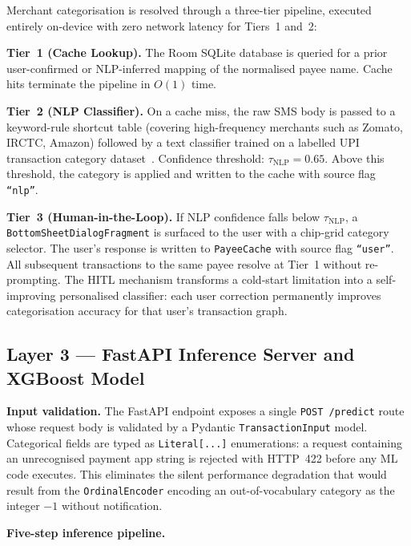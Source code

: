 \documentclass[conference]{IEEEtran}
\begin{document}
Merchant categorisation is resolved through a three-tier pipeline, executed
entirely on-device with zero network latency for Tiers~1 and~2:

\textbf{Tier~1 (Cache Lookup).}
The Room SQLite database is queried for a prior user-confirmed or NLP-inferred
mapping of the normalised payee name. Cache hits terminate the pipeline in
$O(1)$ time.

\textbf{Tier~2 (NLP Classifier).}
On a cache miss, the raw SMS body is passed to a keyword-rule shortcut table
(covering high-frequency merchants such as Zomato, IRCTC, Amazon) followed
by a text classifier trained on a labelled UPI transaction
category dataset~\cite{fintext2024}. Confidence threshold:
$\tau_{\text{NLP}} = 0.65$. Above this threshold, the category is applied
and written to the cache with source flag \texttt{``nlp''}.

\textbf{Tier~3 (Human-in-the-Loop).}
If NLP confidence falls below $\tau_{\text{NLP}}$, a \texttt{BottomSheetDialogFragment}
is surfaced to the user with a chip-grid category selector. The user's
response is written to \texttt{PayeeCache} with source flag
\texttt{``user''}. All subsequent transactions to the same payee resolve
at Tier~1 without re-prompting. The HITL mechanism transforms a cold-start
limitation into a self-improving personalised classifier: each user
correction permanently improves categorisation accuracy for that user's
transaction graph.

\subsection{Layer 3 --- FastAPI Inference Server and XGBoost Model}

\textbf{Input validation.}
The FastAPI endpoint exposes a single \texttt{POST /predict} route whose
request body is validated by a Pydantic \texttt{TransactionInput} model.
Categorical fields are typed as \texttt{Literal[...]} enumerations: a
request containing an unrecognised payment app string is rejected with
HTTP~422 before any ML code executes. This eliminates the silent
performance degradation that would result from the \texttt{OrdinalEncoder}
encoding an out-of-vocabulary category as the integer $-1$ without notification.

\textbf{Five-step inference pipeline.}
\end{document}
